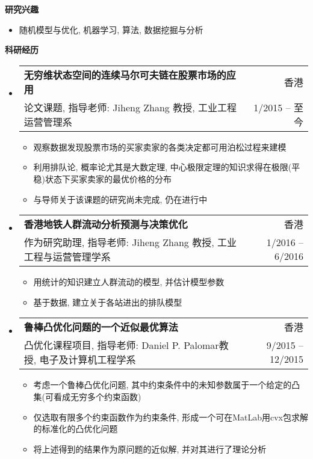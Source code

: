 \documentclass[letterpaper,9pt]{ctexart}
\makeatletter
\newcommand{\resitem}[1]{\item #1 \vspace{-2pt}}
\newcommand{\resheading}[1]{{\large \colorbox{mygrey}{\begin{minipage}{\textwidth}{\textbf{#1 \vphantom{p\^{E}}}}\end{minipage}}}}
\newcommand{\ressubheading}[4]{
\begin{tabular*}{6.5in}{l@{\extracolsep{\fill}}r}
    \textbf{#1} & #2 \\
    #3 & #4 \\
\end{tabular*}\vspace{-6pt}}
\makeatother
\begin{document}
\resheading{研究兴趣}
\begin{itemize}
\item 随机模型与优化, 机器学习, 算法, 数据挖掘与分析
\end{itemize}


\resheading{科研经历}
\begin{itemize}
\item
\ressubheading{无穷维状态空间的连续马尔可夫链在股票市场的应用}{香港}{论文课题, 指导老师: Jiheng Zhang 教授, 工业工程运营管理系}{1/2015 -- 至今}
\begin{itemize}
\resitem{观察数据发现股票市场的买家卖家的各类决定都可用泊松过程来建模}
\resitem{利用排队论, 概率论尤其是大数定理, 中心极限定理的知识求得在极限(平稳)状态下买家卖家的最优价格的分布}
\resitem{与导师关于该课题的研究尚未完成, 仍在进行中}
\end{itemize}


\item
\ressubheading{香港地铁人群流动分析预测与决策优化}{香港}{作为研究助理, 指导老师: Jiheng Zhang 教授, 工业工程与运营管理学系}{1/2016 -- 6/2016}
\begin{itemize}
\resitem{用统计的知识建立人群流动的模型, 并估计模型参数}
\resitem{基于数据, 建立关于各站进出的排队模型}
\end{itemize}




\item 
\ressubheading{鲁棒凸优化问题的一个近似最优算法}{香港}{凸优化课程项目, 指导老师: Daniel P. Palomar教授, 电子及计算机工程学系}{9/2015 -- 12/2015}
\begin{itemize}
\resitem{考虑一个鲁棒凸优化问题, 其中约束条件中的未知参数属于一个给定的凸集(可看成无穷多个约束函数)}
\resitem{仅选取有限多个约束函数作为约束条件, 形成一个可在MatLab用cvx包求解的标准化的凸优化问题}
\resitem{将上述得到的结果作为原问题的近似解, 并对其进行了理论分析}
\end{itemize}



\end{itemize}
\end{document}
